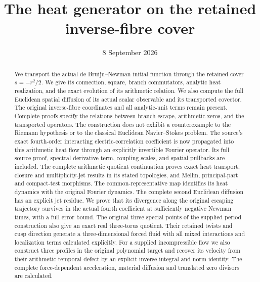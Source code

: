 \documentclass[11pt,a4paper]{article}
\title{The heat generator on the retained inverse-fibre cover}
\author{}
\date{8 September 2026}
\theoremstyle{definition}
\theoremstyle{plain}
\begin{document}
\maketitle
\begin{abstract}
We transport the actual de Bruijn--Newman initial function through the
retained cover $s=-r^2/2$. We give its connection, square, branch
commutators, analytic heat realization, and the exact evolution of its
arithmetic relation. We also compute the full Euclidean spatial
diffusion of its actual scalar observable and its transported covector.
The original inverse-fibre coordinates and all
analytic-unit terms remain present. Complete proofs specify the
relations between branch escape, arithmetic zeros, and the transported
operators. The construction does not exhibit a counterexample to the
Riemann hypothesis or to the classical Euclidean Navier--Stokes problem.
The source's exact fourth-order interacting electric-correlation
coefficient is now propagated into this arithmetic heat flow through
an explicitly invertible Fourier operator. Its full source proof,
spectral derivative term, coupling scales, and spatial pullbacks are
included. The complete arithmetic quotient continuation proves exact
heat transport, closure and multiplicity-jet results in its stated
topologies, and Mellin, principal-part and compact-test morphisms.
The common-representative map identifies its heat dynamics with
the original Fourier dynamics.
The complete second Euclidean diffusion has an explicit jet residue.
We prove that its divergence along the original escaping trajectory
survives in the actual fourth coefficient at sufficiently negative
Newman times, with a full error bound.
The original three special points of the supplied period construction
also give an exact real three-torus quotient. Their retained twists and
cusp direction generate a three-dimensional forced fluid with all mixed
interactions and localization terms calculated explicitly.
For a supplied incompressible flow we also construct three profiles in
the original polynomial target and recover its velocity from their
arithmetic temporal defect by an explicit inverse integral and norm
identity. The complete force-dependent acceleration, material diffusion
and translated zero divisors are calculated.
\end{abstract}
\tableofcontents












\end{document}
